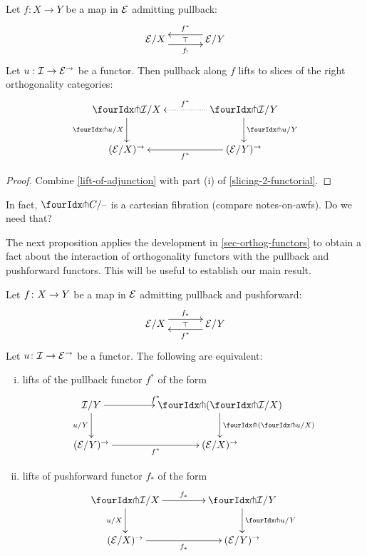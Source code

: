 \documentclass[reqno,10pt,a4paper,oneside]{amsart}
\begin{document}
\begin{proposition}
\label{lift-pullback}
Let $f : X \to Y$ be a map in $\mathcal{E}$ admitting pullback:
\[
\xymatrix@C+1em{
  \catE/X
  \ar@<-5pt>[r]_{f_!}
  \ar@{}[r]|{\top}
&
  \catE/Y
  \ar@<-5pt>[l]_{f^*}
}
\]
Let $u : \mathcal{I} \to \mathcal{E}^{\to}$ be a functor.
Then pullback along $f$ lifts to slices of the right orthogonality categories:
\[
\xymatrix@C=1.5cm{
  \liftr{\cal{I}}/X
  \ar[d]_{\liftr{u}/X}
&
  \liftr{\cal{I}}/Y
  \ar@{.>}[l]_{f^*}
  \ar[d]^{\liftr{u}/Y}
\\
  (\catE/X)^{\to}
&
  (\catE/Y)^{\to}
  \ar[l]^{f^*}
}
\]
\end{proposition}

\begin{proof}
Combine \cref{lift-of-adjunction} with part (i) of \cref{slicing-2-functorial}.
\end{proof}

\begin{question}
In fact, $\liftr{C}/\text{--}$ is a cartesian fibration (compare notes-on-awfs).
Do we need that?
\end{question}

The next proposition applies the development in \cref{sec-orthog-functors} to obtain 
a fact about the interaction of orthogonality functors with the pullback and pushforward
functors. This will be useful to establish our main result.

\begin{proposition}
\label{lift-dependent-product}
Let $f \colon X \to Y$ be a map in $\mathcal{E}$ admitting pullback and pushforward:
\[
\xymatrix@C+1em{
  \catE/X
  \ar@<5pt>[r]^{f_*}
  \ar@{}[r]|{\top}
&
  \catE/Y
  \ar@<5pt>[l]^{f^*}
}
\]
Let $u \colon \mathcal{I} \to \mathcal{E}^{\to}$ be a functor. The following are
equivalent:
\begin{enumerate}[(i)]
\item lifts of the pullback functor $f^*$ of the form
\[
\xymatrix@C=1.5cm{
  \cal{I}/Y
   \ar[r]^{f^*}
  \ar[d]_{u/Y} 
  &
  \liftl{ ( \liftr{\cal{I}}/X ) }
  \ar[d]^{\liftl{(\liftr{u}/X)}}
     \\
     (\catE/Y)^{\to} \ar[r]_{f^*} &
   (\catE/X)^{\to} 
}
\]
\item lifts of pushforward functor $f_*$ of the form
\[
\xymatrix@C=1.5cm{
\liftr{\cal{I}}/X
\ar[r]^{f_*}
  \ar[d]_{u/X}
&
  \liftr{\cal{I}}/Y
  \ar[d]^{\liftr{u}/Y}
\\
  (\catE/X)^{\to}
   \ar[r]_{f_*}
&
  (\catE/Y)^{\to}
 }
\]
\begin{comment}
\item functors $F$ making the following diagram commute:
\[
\xymatrix@C=1.2cm@R=1.5cm{
\liftr{\cal{I}}/X \ar[rr]^F \ar[dr]_{\liftr{u}/X} & &  \liftr{\cal{I}}/ Y \ar[dl]^(.4){\ \liftr{( (u/Y) \cc f^*)}}  \\
 & (\cal{E}/X)^\to & }
\]
\end{comment}
\end{enumerate}
\end{proposition}
\end{document}
